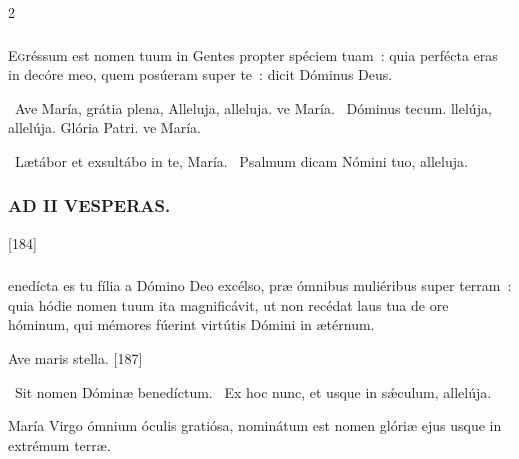 \documentclass[9pt,twoside]{extarticle}
\begin{document}
\begin{multicols}{2}
{{\subsubsection*{}
\lettrine{E}gréssum est nomen tuum in Gentes propter spéciem tuam~: quia perfécta eras in decóre meo, quem posúeram super te~: dicit Dóminus Deus.

\begin{tightlist}{}
\item {}~Ave María, grátia plena, \textred{*} Alleluja, alleluja. ve María. ~Dóminus tecum. llelúja, allelúja. Glória Patri. ve María.
\item {}~Lætábor et exsultábo in te, María. ~Psalmum dicam Nómini tuo, alleluja.
\end{tightlist}

\subsubsection*{\center \textsc{AD II VESPERAS.}}
\begin{tightlist}{}
\item {}
\item {} [184]
\end{tightlist}

\subsubsection*{}
enedícta es tu fília a Dómino Deo excélso, præ ómnibus muliéribus super terram~: quia hódie nomen tuum ita magnificávit, ut non recédat laus tua de ore hóminum, qui mémores fúerint virtútis Dómini in ætérnum.

\begin{tightlist}{}
\item {} Ave maris stella. [187]
\item {}~Sit nomen Dóminæ benedíctum. ~Ex hoc nunc, et usque in sǽculum, allelúja.
\item {} María Virgo ómnium óculis gratiósa, nominátum est nomen glóriæ ejus usque in extrémum terræ.
\end{tightlist}

}}
\end{multicols}
\end{document}
